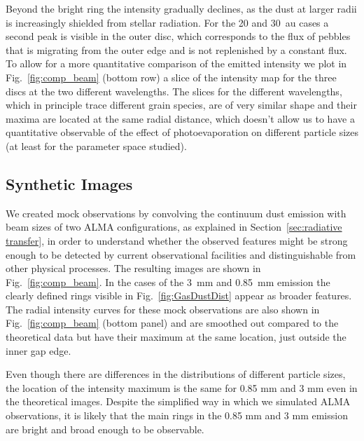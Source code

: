 \documentclass[fleqn,usenatbib]{mnras}
\begin{document}
        Beyond the bright ring the intensity gradually declines, as the dust at larger radii is increasingly shielded from stellar radiation. For the 20 and \SI{30}{au} cases a second peak is visible in the outer disc, which corresponds to the flux of pebbles that is migrating from the outer edge and is not replenished by a constant flux.
        To allow for a more quantitative comparison of the emitted intensity we plot in Fig.~\ref{fig:comp_beam} (bottom row) a slice of the intensity map for the three discs at the two different wavelengths.
        The slices for the different wavelengths, which in principle trace different grain species, are of very similar shape and their maxima are located at the same radial distance, which doesn't allow us to have a quantitative observable of the effect of photoevaporation on different particle sizes (at least for the parameter space studied).
         
    \subsection{Synthetic Images} \label{sec:synthetic-images}
        We created mock observations by convolving the continuum dust emission with beam sizes of two ALMA configurations, as explained in Section~\ref{sec:radiative transfer}, in order to understand whether the observed features might be strong enough to be detected by current observational facilities and distinguishable from other physical processes. 
        The resulting images are shown in Fig.~\ref{fig:comp_beam}.
        In the cases of the \SI{3}{mm} and \SI{0.85}{mm} emission the clearly defined rings visible in Fig.~\ref{fig:GasDustDist} appear as broader features.
        The radial intensity curves for these mock observations are also shown in Fig.~\ref{fig:comp_beam} (bottom panel) and are smoothed out compared to the theoretical data but have their maximum at the same location, just outside the inner gap edge.
        
        Even though there are differences in the distributions of different particle sizes, the location of the intensity maximum is the same for 0.85 mm and 3 mm even in the theoretical images. 
        Despite the simplified way in which we simulated ALMA observations, 
        it is likely that the main rings in the 0.85 mm and 3 mm emission are bright and broad enough to be observable.
        
\end{document}

